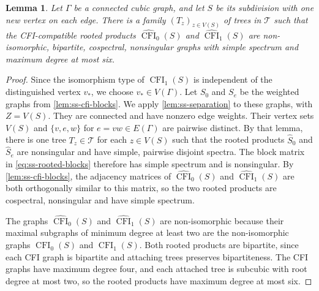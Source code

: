 \documentclass[10pt,a4paper]{article}
\theoremstyle{plain}
\newtheorem{lemma}[theorem]{Lemma}
\theoremstyle{definition}
\DeclareMathOperator{\CFI}{CFI}
\begin{document}
\begin{lemma}\label{lem:ss-cfi-spectrum}
Let $\Gamma$ be a connected cubic graph, and let $S$ be its subdivision
with one new vertex on each edge.
There is a family $(T_z)_{z\in V(S)}$ of trees in $\mathcal T$ such that the
CFI-compatible rooted products $\widehat{\CFI}_0(S)$ and $\widehat{\CFI}_1(S)$
are non-isomorphic, bipartite, cospectral, nonsingular graphs with
simple spectrum and maximum degree at most six.
\end{lemma}
\begin{proof}
Since the isomorphism type of $\CFI_1(S)$ is independent of the
distinguished vertex $v_*$, we choose $v_*\in V(\Gamma)$.
Let $S_0$ and $S_e$ be the weighted graphs from \cref{lem:ss-cfi-blocks}.
We apply \cref{lem:ss-separation} to these graphs,
with $Z=V(S)$.
They are connected and have nonzero edge weights. Their vertex sets
$V(S)$ and $\{v,e,w\}$ for $e=vw\in E(\Gamma)$ are pairwise distinct.
By that lemma, there is one tree $T_z\in\mathcal T$ for each
$z\in V(S)$ such that the rooted products $\widehat S_0$ and
$\widehat S_e$ are nonsingular and have simple, pairwise disjoint
spectra.
The block matrix in \cref{eq:ss-rooted-blocks} therefore has simple
spectrum and is nonsingular.
By \cref{lem:ss-cfi-blocks}, the adjacency matrices of
$\widehat{\CFI}_0(S)$ and $\widehat{\CFI}_1(S)$ are both
orthogonally similar to this matrix, so the two rooted products are
cospectral, nonsingular and have simple spectrum.

The graphs $\widehat{\CFI}_0(S)$ and $\widehat{\CFI}_1(S)$ are
non-isomorphic because their maximal subgraphs of minimum degree at least two
are the non-isomorphic graphs $\CFI_0(S)$ and $\CFI_1(S)$.
Both rooted products are bipartite, since each CFI graph is bipartite
and attaching trees preserves bipartiteness.
The CFI graphs have maximum degree four, and each attached tree is
subcubic with root degree at most two, so the rooted products have
maximum degree at most six.
\end{proof}
\end{document}
